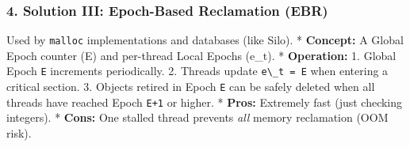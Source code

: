 \hypertarget{solution-iii-epoch-based-reclamation-ebr}{%
\subsubsection{4. Solution III: Epoch-Based Reclamation
(EBR)}\label{solution-iii-epoch-based-reclamation-ebr}}

Used by \passthrough{\lstinline!malloc!} implementations and databases
(like Silo). * \textbf{Concept:} A Global Epoch counter (E) and
per-thread Local Epochs (e\_t). * \textbf{Operation:} 1. Global Epoch
\passthrough{\lstinline!E!} increments periodically. 2. Threads update
\passthrough{\lstinline!e\_t = E!} when entering a critical section. 3.
Objects retired in Epoch \passthrough{\lstinline!E!} can be safely
deleted when all threads have reached Epoch
\passthrough{\lstinline!E+1!} or higher. * \textbf{Pros:} Extremely fast
(just checking integers). * \textbf{Cons:} One stalled thread prevents
\emph{all} memory reclamation (OOM risk).
